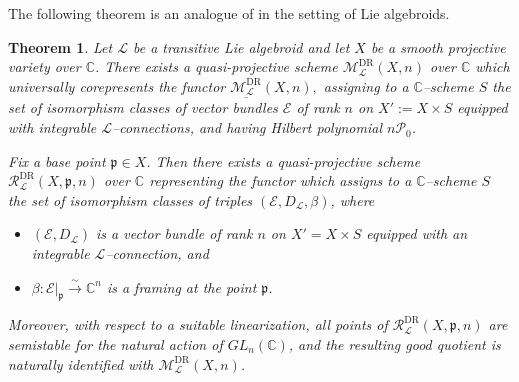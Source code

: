 \documentclass[12pt,reqno]{amsart}
\numberwithin{equation}{subsection}
\newtheorem{thm}[equation]{Theorem}
\theoremstyle{definition}
\theoremstyle{theorem}
\begin{document}
The following theorem is an analogue of \cite[\S\,6, Theorem~6.13]{CT.Simpson-1995} in the setting of Lie algebroids.
\begin{thm}\label{eqn: moduli-of-L-connection on VB}
Let $\mathcal{L}$ be a transitive Lie algebroid and let $X$ be a smooth projective variety over $\mathbb{C}$. There exists a
quasi-projective scheme $\mathcal{M}^{\text{DR}}_{\mathcal{L}}(X,n)$ over $\mathbb{C}$ which universally corepresents the functor 
$\underline{\mathcal{M}^{\text{DR}}_{\mathcal{L}}}(X,n),$
assigning to a $\mathbb{C}$--scheme $S$ the set of isomorphism classes of
vector bundles $\mathcal{E}$ of rank $n$ on $X' := X \times S$
equipped with integrable $\mathcal{L}$--connections, and having Hilbert
polynomial $n\mathcal{P}_{0}$.
	
Fix a base point $\mathfrak{p} \in X$.  
Then there exists a quasi-projective scheme $\mathcal{R}^{\text{DR}}_{\mathcal{L}}(X,\mathfrak{p},n)$ over $\mathbb{C}$ representing the functor which assigns to a $\mathbb{C}$--scheme $S$ the set of isomorphism classes of triples $(\mathcal{E},D_{\mathcal{L}},\beta)$, where
\begin{itemize}
		\item $(\mathcal{E},D_{\mathcal{L}})$ is a vector bundle of rank $n$ on $X' = X \times S$ equipped with an integrable $\mathcal{L}$--connection, and
		\item $\beta : \mathcal{E}|_{\mathfrak{p}} \xrightarrow{\sim} \mathbb{C}^{n}$ is a framing at the point $\mathfrak{p}$.
\end{itemize}
	Moreover, with respect to a suitable linearization, all points of $\mathcal{R}^{\text{DR}}_{\mathcal{L}}(X,\mathfrak{p},n)$ are semistable for the natural action of $GL_{n}(\mathbb{C})$, and the resulting good quotient is naturally identified with $\mathcal{M}^{\text{DR}}_{\mathcal{L}}(X,n)$.
\end{thm}
\end{document}
